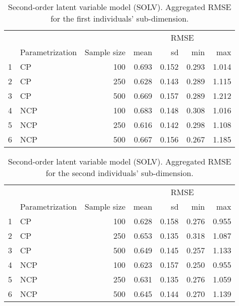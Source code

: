 %
\begin{table}[H]
	\centering
	\begin{tabular}{rlrrrrr}
		\hline
		\multicolumn{3}{c}{ } & \multicolumn{4}{c}{ RMSE } \\ 
		\cmidrule(rl){4-7}
		& Parametrization & Sample size & mean & sd & min & max \\  
		\hline\hline
		1 & CP &  100 & 0.693 & 0.152 & 0.293 & 1.014 \\
		2 & CP &  250 & 0.628 & 0.143 & 0.289 & 1.115 \\  
		3 & CP &  500 & 0.669 & 0.157 & 0.289 & 1.212 \\ 
		\hline
		4 & NCP &  100 & 0.683 & 0.148 & 0.308 & 1.016 \\ 
		5 & NCP &  250 & 0.616 & 0.142 & 0.298 & 1.108 \\ 
		6 & NCP &  500 & 0.667 & 0.156 & 0.267 & 1.185 \\
		\hline
	\end{tabular}
	\caption[Second-order latent variable model (SOLV). Aggregated RMSE for the first individuals' sub-dimension.]%
	{Second-order latent variable model (SOLV). Aggregated RMSE for the first individuals' sub-dimension.}
	\label{tab:SOLV_RMSE_theta1}
\end{table}
%
\begin{table}[H]
	\centering
	\begin{tabular}{rlrrrrr}
		\hline
		\multicolumn{3}{c}{ } & \multicolumn{4}{c}{ RMSE } \\ 
		\cmidrule(rl){4-7}
		& Parametrization & Sample size & mean & sd & min & max \\  
		\hline\hline
		1 & CP &  100 & 0.628 & 0.158 & 0.276 & 0.955 \\  
		2 & CP &  250 & 0.653 & 0.135 & 0.318 & 1.087 \\  
		3 & CP &  500 & 0.649 & 0.145 & 0.257 & 1.133 \\  
		\hline
		4 & NCP &  100 & 0.623 & 0.157 & 0.250 & 0.955 \\ 
		5 & NCP &  250 & 0.631 & 0.135 & 0.276 & 1.059 \\  
		6 & NCP &  500 & 0.645 & 0.144 & 0.270 & 1.139 \\  
		\hline
	\end{tabular}
	\caption[Second-order latent variable model (SOLV). Aggregated RMSE for the second individuals' sub-dimension.]%
	{Second-order latent variable model (SOLV). Aggregated RMSE for the second individuals' sub-dimension.}
	\label{tab:SOLV_RMSE_theta2}
\end{table}
